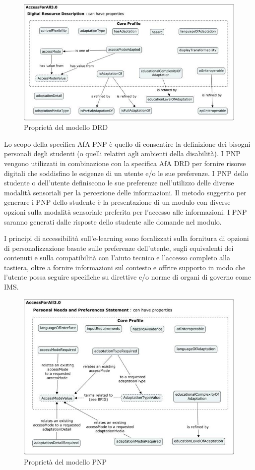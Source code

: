 \begin{figure}[H]
\centering
\includegraphics[scale=0.7]{res/drd.png}
\caption{Proprietà del modello DRD}
\label{fig:drd}
\end{figure}

Lo scopo della specifica AfA PNP è quello di consentire la definizione dei bisogni personali degli studenti (o quelli relativi agli ambienti della disabilità). I PNP vengono utilizzati in combinazione con la specifica AfA DRD per fornire risorse digitali che soddisfino le esigenze di un utente e/o le sue preferenze. I PNP dello studente o dell'utente definiscono le sue preferenze nell'utilizzo delle diverse modalità sensoriali per la percezione delle informazioni. Il metodo suggerito per generare i PNP dello studente è la presentazione di un modulo con diverse opzioni sulla modalità sensoriale preferita per l'accesso alle informazioni. I PNP saranno generati dalle risposte dello studente alle domande nel modulo.

I principi di accessibilità sull'e-learning sono focalizzati sulla fornitura di opzioni di personalizzazione basate sulle preferenze dell'utente, sugli equivalenti dei contenuti e sulla compatibilità con l'aiuto tecnico e l'accesso completo alla tastiera, oltre a fornire informazioni sul contesto e offrire supporto in modo che l'utente possa seguire specifiche su direttive e/o norme di organi di governo come IMS.

\begin{figure}[H]
\centering
\includegraphics[scale=0.7]{res/pnp.png}
\caption{Proprietà del modello PNP}
\label{fig:pnp}
\end{figure}

